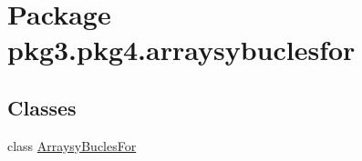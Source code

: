 \hypertarget{namespacepkg3_1_1pkg4_1_1arraysybuclesfor}{}\section{Package pkg3.\+pkg4.\+arraysybuclesfor}
\label{namespacepkg3_1_1pkg4_1_1arraysybuclesfor}
\subsection*{Classes}
\begin{DoxyCompactItemize}
\item 
class \mbox{\hyperlink{classpkg3_1_1pkg4_1_1arraysybuclesfor_1_1_arraysy_bucles_for}{Arraysy\+Bucles\+For}}
\end{DoxyCompactItemize}
